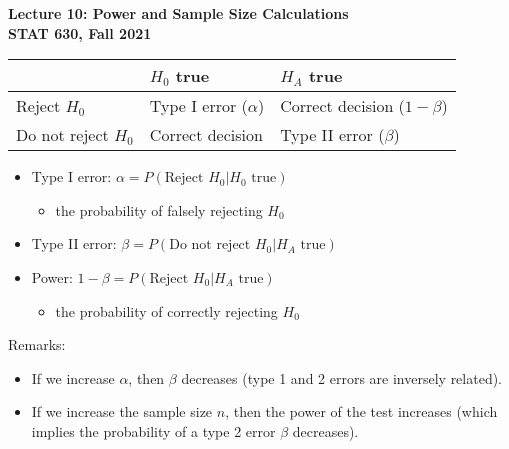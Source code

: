 \documentclass[12pt, fleqn]{article}\usepackage[]{graphicx}\usepackage[]{color}
\begin{document}
\setlength\parindent{0pt}

\begin{center}
\textbf{Lecture 10: Power and Sample Size Calculations}\\
\textbf{STAT 630, Fall 2021}\\
\hrulefill
\end{center}

\begin{table}[ht]
\begin{tabular}{l|l|l}
 & $H_0$ true & $H_A$ true\\
\hline
Reject $H_0$ & Type I error ($\alpha$) & Correct decision ($1-\beta$)\\
\hline
Do not reject $H_0$ & Correct decision & Type II error ($\beta$)\\
\end{tabular}
\end{table}

\begin{itemize}
\item Type I error: $\alpha = P( \text{Reject } H_0 | H_0 \text{ true})$
\begin{itemize}
\item the probability of falsely rejecting $H_0$
\end{itemize}
\item Type II error: $\beta = P( \text{Do not reject } H_0 | H_A \text{ true})$
\item Power: $1 - \beta = P(\text{Reject } H_0 | H_A \text{ true})$
\begin{itemize}
\item the probability of correctly rejecting $H_0$
\end{itemize}
\end{itemize}

Remarks:
\begin{itemize}
\item If we increase $\alpha$, then $\beta$ decreases (type 1 and 2 errors are inversely related).
\item If we increase the sample size $n$, then the power of the test increases (which implies the probability of a type 2 error $\beta$ decreases).\\
\end{itemize}
\vspace{10pt}
\end{document}
